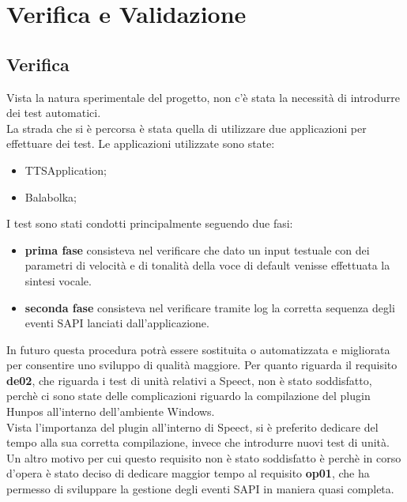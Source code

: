\chapter{Verifica e Validazione}
\thispagestyle{empty}

\newpage
\section{Verifica}
Vista la natura sperimentale del progetto, non c'è stata la necessità di introdurre dei test automatici.\\
La strada che si è percorsa è stata quella di utilizzare due applicazioni per effettuare dei test.
Le applicazioni utilizzate sono state:
\begin{itemize}
	\item TTSApplication;
	\item Balabolka;
\end{itemize}
I test sono stati condotti principalmente seguendo due fasi:
\begin{itemize}
	\item \textbf{prima fase} consisteva nel verificare che dato un input testuale con dei parametri di velocità e di tonalità della voce di default venisse effettuata la sintesi vocale.
	\item \textbf{seconda fase} consisteva nel verificare tramite log la corretta sequenza degli eventi SAPI lanciati dall'applicazione.
\end{itemize}
In futuro questa procedura potrà essere sostituita o automatizzata e migliorata per consentire uno sviluppo di qualità maggiore.
Per quanto riguarda il requisito \textbf{de02}, che riguarda i test di unità relativi a Speect, non è stato soddisfatto, perchè ci sono state delle complicazioni riguardo la compilazione del plugin Hunpos all'interno dell'ambiente Windows.\\
Vista l'importanza del plugin all'interno di Speect, si è preferito dedicare del tempo alla sua corretta compilazione, invece che introdurre nuovi test di unità.
Un altro motivo per cui questo requisito non è stato soddisfatto è perchè in corso d'opera è stato deciso di dedicare maggior tempo al requisito \textbf{op01}, che ha permesso di sviluppare la gestione degli eventi SAPI in maniera quasi completa.
